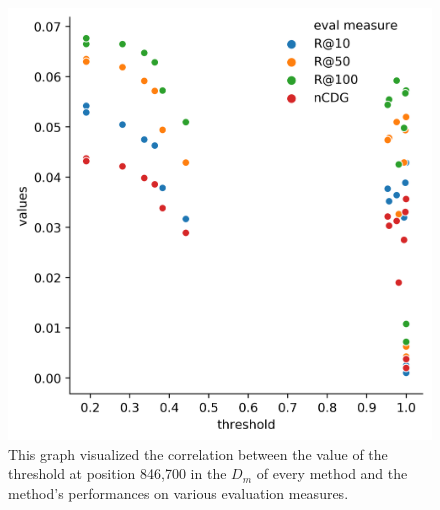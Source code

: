 \begin{figure}[h]
    \centering
	\includegraphics[width=1\linewidth]{./img/nn_threshold_performance_correlation.png}
	\caption[Threshold value and performance correlation graph]{This graph visualized the correlation between the value of the threshold at position 846,700 in the $D_m$ of every method and the method's performances on various evaluation measures.}
	\label{fig:threshold_correlation_graph}
\end{figure}




